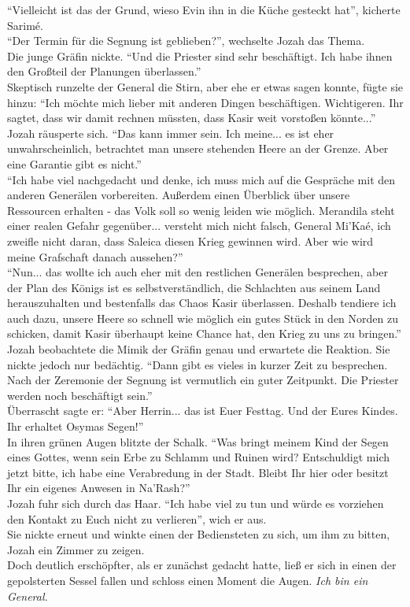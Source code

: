 ``Vielleicht ist das der Grund, wieso Evin ihn in die Küche gesteckt hat'', kicherte Sarimé.\\
``Der Termin für die Segnung ist geblieben?'', wechselte Jozah das Thema.\\
Die junge Gräfin nickte. ``Und die Priester sind sehr beschäftigt. Ich habe ihnen den Großteil der 
Planungen überlassen.''\\
Skeptisch runzelte der General die Stirn, aber ehe er etwas sagen konnte, fügte sie hinzu: ``Ich 
möchte mich lieber mit anderen Dingen beschäftigen. Wichtigeren. Ihr sagtet, dass wir damit rechnen 
müssten, dass Kasir weit vorstoßen könnte...''\\
Jozah räusperte sich. ``Das kann immer sein. Ich meine... es ist eher unwahrscheinlich, betrachtet 
man unsere stehenden Heere an der Grenze. Aber eine Garantie gibt es nicht.''\\
``Ich habe viel nachgedacht und denke, ich muss mich auf die Gespräche mit den anderen Generälen 
vorbereiten. Außerdem einen Überblick über unsere Ressourcen erhalten - das Volk soll so wenig 
leiden wie möglich. Merandila steht einer realen Gefahr gegenüber... versteht mich nicht falsch, 
General Mi'Kaé, ich zweifle nicht daran, dass Saleica diesen Krieg gewinnen wird. Aber wie wird 
meine Grafschaft danach aussehen?''\\
``Nun... das wollte ich auch eher mit den restlichen Generälen besprechen, aber der Plan des Königs 
ist es selbstverständlich, die Schlachten aus seinem Land herauszuhalten und bestenfalls das Chaos 
Kasir überlassen. Deshalb tendiere ich auch dazu, unsere Heere so schnell wie möglich ein gutes 
Stück in den Norden zu schicken, damit Kasir überhaupt keine Chance hat, den Krieg zu uns zu 
bringen.''\\
Jozah beobachtete die Mimik der Gräfin genau und erwartete die Reaktion. Sie nickte jedoch nur 
bedächtig. ``Dann gibt es vieles in kurzer Zeit zu besprechen. Nach der Zeremonie der Segnung ist 
vermutlich ein guter Zeitpunkt. Die Priester werden noch beschäftigt sein.''\\
Überrascht sagte er: ``Aber Herrin... das ist Euer Festtag. Und der Eures Kindes. Ihr erhaltet 
Osymas Segen!''\\
In ihren grünen Augen blitzte der Schalk. ``Was bringt meinem Kind der Segen eines Gottes, wenn 
sein Erbe zu Schlamm und Ruinen wird? Entschuldigt mich jetzt bitte, ich habe eine Verabredung in 
der Stadt. Bleibt Ihr hier oder besitzt Ihr ein eigenes Anwesen in Na'Rash?''\\
Jozah fuhr sich durch das Haar. ``Ich habe viel zu tun und würde es vorziehen den Kontakt zu Euch 
nicht zu verlieren'', wich er aus.\\
Sie nickte erneut und winkte einen der Bediensteten zu sich, um ihm zu bitten, Jozah ein Zimmer zu 
zeigen.\\
Doch deutlich erschöpfter, als er zunächst gedacht hatte, ließ er sich in einen der gepolsterten 
Sessel fallen und schloss einen Moment die Augen. \textit{Ich bin ein General.}\\

